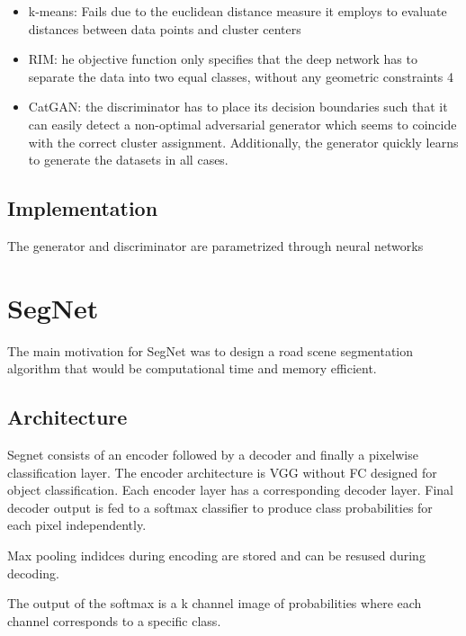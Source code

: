\documentclass{article}
\begin{document}
\begin{itemize}

\item k-means:
Fails due to the euclidean distance measure it employs to evaluate distances between data points and cluster centers

\item RIM: he objective function only specifies that the deep network has to
separate the data into two equal classes, without any geometric constraints 4

\item CatGAN: the discriminator has to place its decision boundaries such that it can easily detect a non-optimal adversarial generator which seems to coincide with the correct cluster assignment. Additionally, the generator quickly learns to generate the datasets in all cases.

\end{itemize}

\subsection{Implementation}

The generator and discriminator are parametrized through neural networks

\section{SegNet}

The main motivation for SegNet was to design a road scene segmentation algorithm that would be computational time and memory efficient.


\subsection{Architecture}
Segnet consists of an encoder followed by a decoder and finally a pixelwise classification layer. The encoder architecture is VGG without FC designed for object classification. Each encoder layer has a corresponding decoder layer. Final decoder output is fed to a softmax classifier to produce class probabilities for each pixel independently.

Max pooling indidces during encoding are stored and can be resused during decoding.

The output of the softmax is a k channel image of probabilities where each channel corresponds to a specific class.
\end{document}
